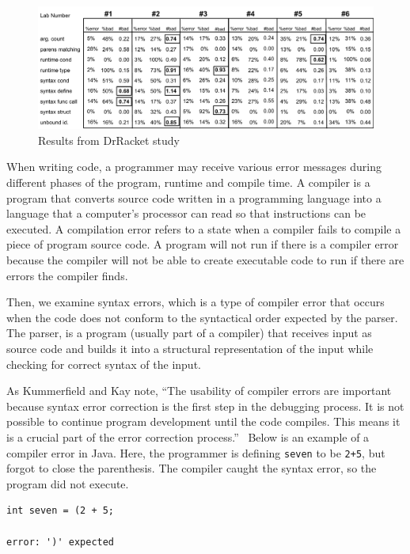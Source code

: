 \documentclass{sig-alternate}
\begin{document}
\begin{figure}\label{fig:drracketdata}
  \centering
  \includegraphics[keepaspectratio, width= 1.0 \textwidth]{MEE-Data.pdf}
  \caption{Results from DrRacket study}
  \label{fig:drracketstudy}
\end{figure}

When writing code, a programmer may receive various error messages during different phases of the program, runtime and compile time.
A compiler is a program that converts source code written in a programming language into a language that a computer's processor can read so that instructions can be executed.
A compilation error refers to a state when a compiler fails to compile a piece of  program source code.
A program will not run if there is a compiler error because the compiler will not be able to create executable code to run if there are errors the compiler finds. 

Then, we examine syntax errors, which is a type of compiler error that occurs when the code does not conform to the syntactical order expected by the parser.
The parser, is a program (usually part of a compiler) that receives input as source code and builds it into a structural representation of the input while checking for correct syntax of the input.

As Kummerfield and Kay note, ``The usability of compiler errors are important because syntax error correction is the first step in the debugging process. It is not possible to continue program development until the code compiles. This means it is a crucial part of the error correction process.''~\cite{Kummerfeld:2003:NBF:858403.858416}
Below is an example of a compiler error in Java. Here, the programmer is defining \texttt{seven} to be \texttt{2+5}, but forgot to close the parenthesis. The compiler caught the syntax error, so the program did not execute.

\begin{verbatim}
int seven = (2 + 5;

error: ')' expected
\end{verbatim}
\end{document}

